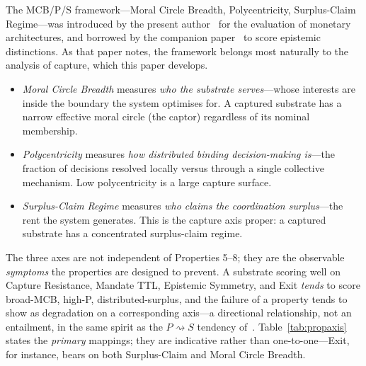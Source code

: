 \documentclass[11pt]{article}
\theoremstyle{definition}
\theoremstyle{plain}
\begin{document}
The MCB/P/S framework---Moral Circle Breadth, Polycentricity, Surplus-Claim
Regime---was introduced by the present author~\cite{nicholson2025} for the
evaluation of monetary architectures, and borrowed by the companion
paper~\cite{nicholson2026hlks} to score epistemic distinctions. As that paper notes,
the framework belongs most naturally to the analysis of capture, which this paper
develops.

\begin{itemize}
\item \emph{Moral Circle Breadth} measures \emph{who the substrate serves}---whose
  interests are inside the boundary the system optimises for. A captured substrate
  has a narrow effective moral circle (the captor) regardless of its nominal
  membership.
\item \emph{Polycentricity} measures \emph{how distributed binding decision-making
  is}---the fraction of decisions resolved locally versus through a single
  collective mechanism. Low polycentricity is a large capture surface.
\item \emph{Surplus-Claim Regime} measures \emph{who claims the coordination
  surplus}---the rent the system generates. This is the capture axis proper: a
  captured substrate has a concentrated surplus-claim regime.
\end{itemize}

The three axes are not independent of Properties 5--8; they are the observable
\emph{symptoms} the properties are designed to prevent. A substrate scoring well on
Capture Resistance, Mandate TTL, Epistemic Symmetry, and Exit \emph{tends} to score
broad-MCB, high-P, distributed-surplus, and the failure of a property tends to show
as degradation on a corresponding axis---a directional relationship, not an
entailment, in the same spirit as the $P \rightsquigarrow S$ tendency
of~\cite{nicholson2025}. Table~\ref{tab:propaxis} states the \emph{primary} mappings;
they are indicative rather than one-to-one---Exit, for instance, bears on both
Surplus-Claim and Moral Circle Breadth.
\end{document}
